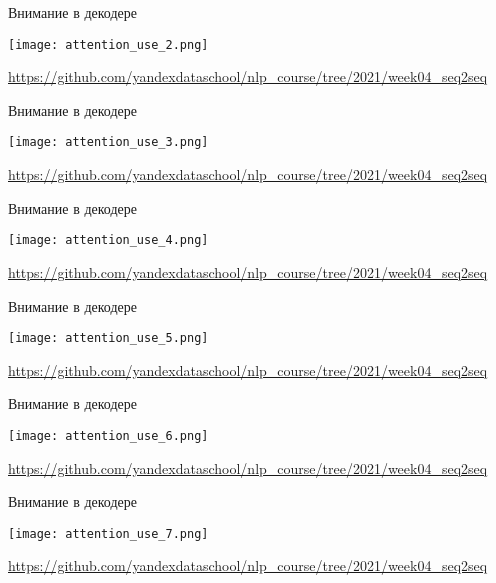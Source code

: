 \documentclass[notes,12pt, aspectratio=169]{beamer}
\begin{document}
\begin{frame}{Внимание в декодере}
	\begin{center}
		\texttt{[image: attention\_use\_2.png]}
	\end{center}
	\vfill
	\footnotesize  {\color{blue} \url{https://github.com/yandexdataschool/nlp_course/tree/2021/week04_seq2seq}} 
\end{frame} 

\begin{frame}{Внимание в декодере}
	\begin{center}
		\texttt{[image: attention\_use\_3.png]}
	\end{center}
	\vfill
	\footnotesize  {\color{blue} \url{https://github.com/yandexdataschool/nlp_course/tree/2021/week04_seq2seq}} 
\end{frame} 

\begin{frame}{Внимание в декодере}
	\begin{center}
		\texttt{[image: attention\_use\_4.png]}
	\end{center}
	\vfill
	\footnotesize  {\color{blue} \url{https://github.com/yandexdataschool/nlp_course/tree/2021/week04_seq2seq}} 
\end{frame} 

\begin{frame}{Внимание в декодере}
	\begin{center}
		\texttt{[image: attention\_use\_5.png]}
	\end{center}
	\vfill
	\footnotesize  {\color{blue} \url{https://github.com/yandexdataschool/nlp_course/tree/2021/week04_seq2seq}} 
\end{frame} 

\begin{frame}{Внимание в декодере}
	\begin{center}
		\texttt{[image: attention\_use\_6.png]}
	\end{center}
	\vfill
	\footnotesize  {\color{blue} \url{https://github.com/yandexdataschool/nlp_course/tree/2021/week04_seq2seq}} 
\end{frame} 

\begin{frame}{Внимание в декодере}
	\begin{center}
		\texttt{[image: attention\_use\_7.png]}
	\end{center}
	\vfill
	\footnotesize  {\color{blue} \url{https://github.com/yandexdataschool/nlp_course/tree/2021/week04_seq2seq}} 
\end{frame} 
\end{document}
